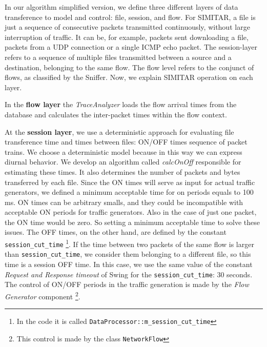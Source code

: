 In our algorithm simplified version, we define three different layers of data transference to model and control: file, session, and flow. For SIMITAR, a file is just a sequence of consecutive packets transmitted continuously, without large interruption of traffic. It can be, for example, packets sent downloading a file, packets from a  UDP  connection or a single ICMP echo packet. The session-layer refers to a sequence of multiple files transmitted between a source and a destination, belonging to the same flow.  The flow level refers to the conjunct of flows, as classified by the Sniffer.  Now, we explain SIMITAR operation on each layer. 


In the \textbf{flow layer} the \textit{TraceAnalyzer} loads the flow arrival times from the database and calculates the inter-packet times within the flow context. 


At the \textbf{session layer}, we use a deterministic approach for evaluating file transference time and times between files: ON/OFF times sequence of packet trains. We choose a deterministic model because in this way we can express diurnal behavior\cite{harpoon-paper}.  We develop an algorithm called \textit{calcOnOff} responsible for estimating these times. It also determines the number of packets and bytes transferred by each file. Since the ON times will serve as input for actual traffic generators, we defined a minimum acceptable time for on periods equals to 100 ms. ON times can be arbitrary smalls, and they could be incompatible with acceptable ON periods for traffic generators. Also in the case of just one packet, the ON time would be zero. So setting a minimum acceptable time to solve these issues. The OFF times, on the other hand, are defined by the constant \texttt{session\_cut\_time} \footnote{In the code it is called \texttt{DataProcessor::m\_session\_cut\_time} }. If the time between two packets of the same flow is larger than \texttt{session\_cut\_time}, we consider them belonging to a different file, so this time is a session OFF time. In this case, we use the same value of the constant \textit{Request and Response timeout} of Swing\cite{swing-paper} for the \texttt{session\_cut\_time}: 30 seconds. The control of ON/OFF periods in the traffic generation is made by the \textit{Flow Generator} component \footnote{This control is made by the class \texttt{NetworkFlow}}.


